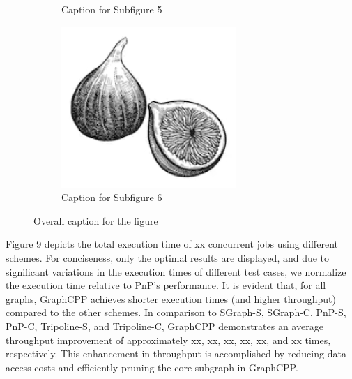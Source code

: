 \documentclass[lettersize,journal]{IEEEtran} %
\begin{document}
\begin{figure}[!t]
\begin{subfigure}{0.3\columnwidth}
      \caption{Caption for Subfigure 5}
      \label{fig:subfig5}
    \end{subfigure}
    \hfill
    \begin{subfigure}{0.3\columnwidth}
      \includegraphics[width=\linewidth]{fig1.png}
      \caption{Caption for Subfigure 6}
      \label{fig:subfig6}
    \end{subfigure}
  
    \caption{Overall caption for the figure}
    \label{fig:overall}
  \end{figure}
  

Figure 9 depicts the total execution time of xx concurrent jobs using different schemes. For conciseness, only the optimal results are displayed, and due to significant variations in the execution times of different test cases, we normalize the execution time relative to PnP's performance. It is evident that, for all graphs, GraphCPP achieves shorter execution times (and higher throughput) compared to the other schemes. In comparison to SGraph-S, SGraph-C, PnP-S, PnP-C, Tripoline-S, and Tripoline-C, GraphCPP demonstrates an average throughput improvement of approximately xx, xx, xx, xx, xx, and xx times, respectively. This enhancement in throughput is accomplished by reducing data access costs and efficiently pruning the core subgraph in GraphCPP.
\end{document}
